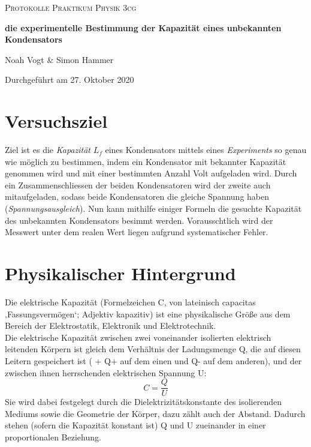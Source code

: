 \documentclass[a4paper,12pt]{article}
\begin{document}
\begin{titlepage}

\vspace*{1cm}
	\centering
	
	{\scshape\Large Protokolle Praktikum Physik 3cg \par}
	\vspace{0.5cm}
	{\huge\bfseries die experimentelle Bestimmung der Kapazität eines unbekannten Kondensators\par}
	\vspace{0.5cm}
	{\Large Noah Vogt \& Simon Hammer\par}
	\vspace{17cm}

	{\large Durchgeführt am 27. Oktober 2020\par}
	
\end{titlepage}

\tableofcontents
\pagebreak

\section{Versuchsziel}
Ziel ist es die \textit{Kapazität} $L_f$ eines Kondensators mittels eines \textit{Experiments} so genau wie möglich zu bestimmen, indem ein Kondensator mit bekannter Kapazität genommen wird und mit einer bestimmten Anzahl Volt aufgeladen wird. Durch ein Zusammenschliessen der beiden Kondensatoren wird der zweite auch mitaufgeladen, sodass beide Kondensatoren die gleiche Spannung haben (\textit{Spannungsausgleich}). Nun kann mithilfe einiger Formeln die gesuchte Kapazität des unbekannten Kondensators besimmt werden. Vorausschtlich wird der Messwert unter dem realen Wert liegen aufgrund systematischer Fehler.

\section{Physikalischer Hintergrund}

Die elektrische Kapazität (Formelzeichen C, von lateinisch capacitas ‚Fassungsvermögen‘; Adjektiv kapazitiv) ist eine physikalische Größe aus dem Bereich der Elektrostatik, Elektronik und Elektrotechnik.\\

Die elektrische Kapazität zwischen zwei voneinander isolierten elektrisch leitenden Körpern ist gleich dem Verhältnis der Ladungsmenge Q, die auf diesen Leitern gespeichert ist ( + Q+ auf dem einen und Q- auf dem anderen), und der zwischen ihnen herrschenden elektrischen Spannung U:
$$C=\frac{Q}{U}$$
Sie wird dabei festgelegt durch die Dielektrizitätskonstante des isolierenden Mediums sowie die Geometrie der Körper, dazu zählt auch der Abstand. Dadurch stehen (sofern die Kapazität konstant ist) Q und U zueinander in einer proportionalen Beziehung.\\
\end{document}
